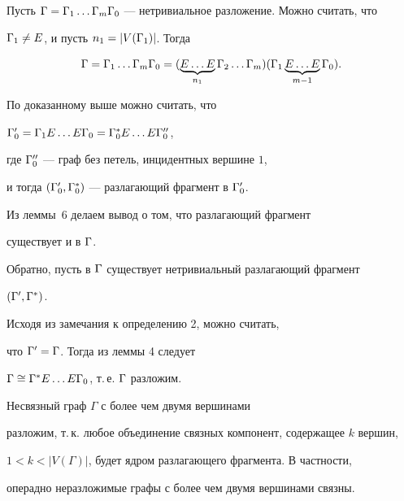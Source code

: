 \begin{pf}


Пусть ${\Gamma}={\Gamma}_1\dotsc{\Gamma}_m{\Gamma}_0$ --- нетривиальное разложение. Можно считать, что


${\Gamma}_1\ne E$, и пусть $n_1=| V({\Gamma}_1) |$. Тогда


$$


\G=\G_1\dotsc\G_m\G_0=(\underbrace{E\dotsc E}_{n_1}


\G_2\dotsc\G_m)(\G_1\underbrace{E\dotsc E}_{m-1}\G_0). 


$$





По доказанному выше можно считать, что 


${\Gamma}'_0={\Gamma}_1E\dotsc E{\Gamma}_0={\Gamma}^*_0E\dotsc E{\Gamma}''_0$,


где ${\Gamma}''_0$ --- граф без петель, инцидентных вершине $1$, 


и тогда $({\Gamma}'_0, {\Gamma}^*_0)$ --- разлагающий фрагмент в ${\Gamma}'_0$. 


Из леммы~6 делаем вывод о том, что разлагающий фрагмент 


существует и в ${\Gamma}$. 





Обратно, пусть в ${\Gamma}$ существует нетривиальный разлагающий фрагмент


$({\Gamma}', {\Gamma}^*)$.


Исходя из замечания к определению 2, можно считать, 


что ${\Gamma}'={\Gamma}$. Тогда из леммы 4 следует


${\Gamma}\cong{\Gamma}^*E\dotsc E{\Gamma}_0$, т.\,е. ${\Gamma}$ разложим.


\end{pf} 





\begin{note}


Несвязный граф $\Gamma$ с более чем двумя вершинами


разложим, т.\,к. любое объединение связных компонент, содержащее $k$ вершин,


$1< k < |V(\Gamma)|$, будет ядром разлагающего фрагмента. В частности,


операдно неразложимые графы с более чем двумя вершинами связны.


\end{note}








